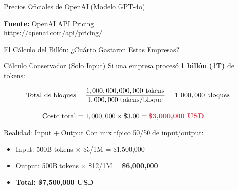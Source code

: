 \documentclass[aspectratio=169,11pt]{beamer}
\begin{document}
\begin{frame}{Precios Oficiales de OpenAI (Modelo GPT-4o)}
\begin{center}
\end{center}

\vspace{0.3cm}

\footnotesize
\textbf{Fuente:} OpenAI API Pricing \\
\url{https://openai.com/api/pricing/}
\end{frame}

\begin{frame}{El Cálculo del Billón: ¿Cuánto Gastaron Estas Empresas?}
\begin{exampleblock}{Cálculo Conservador (Solo Input)}
Si una empresa procesó \textbf{1 billón (1T)} de tokens:

\vspace{0.3cm}

\begin{align*}
\text{Total de bloques} &= \frac{1,000,000,000,000 \text{ tokens}}{1,000,000 \text{ tokens/bloque}} = 1,000,000 \text{ bloques} \\[0.3cm]
\text{Costo total} &= 1,000,000 \times \$3.00 = \textcolor{kavakred}{\textbf{\$3,000,000 USD}}
\end{align*}
\end{exampleblock}

\begin{alertblock}{Realidad: Input + Output}
Con mix típico 50/50 de input/output:
\begin{itemize}
    \item Input: 500B tokens × \$3/1M = \$1,500,000
    \item Output: 500B tokens × \$12/1M = \textbf{\$6,000,000}
    \item \textbf{Total: \textcolor{kavakred}{\$7,500,000 USD}}
\end{itemize}
\end{alertblock}
\end{frame}
\end{document}
